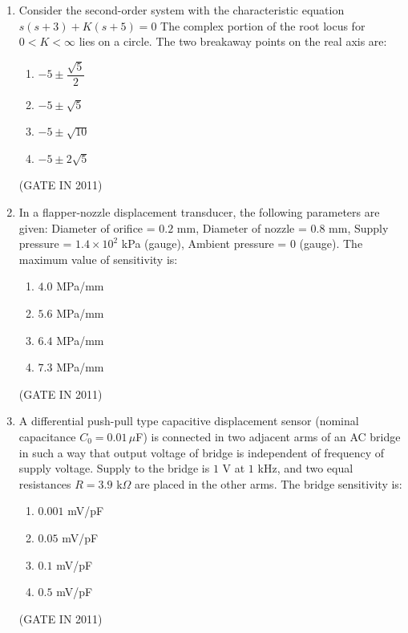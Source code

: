 \documentclass[journal]{IEEEtran}
\begin{document}
\begin{enumerate}
\item Consider the second-order system with the characteristic equation  
$s(s + 3) + K(s + 5) = 0$  
The complex portion of the root locus for $0 < K < \infty$ lies on a circle. The two breakaway points on the real axis are:
\begin{multicols}{4}
\begin{enumerate}
\item $-5 \pm \dfrac{\sqrt{5}}{2}$  
\item $-5 \pm \sqrt{5}$  
\item $-5 \pm \sqrt{10}$  
\item $-5 \pm {2}\sqrt{5}$
\end{enumerate}
\end{multicols} \hfill(GATE IN 2011)

\item In a flapper-nozzle displacement transducer, the following parameters are given:  
Diameter of orifice = $0.2$ mm, Diameter of nozzle = $0.8$ mm, Supply pressure = $1.4 \times 10^2$ kPa (gauge), Ambient pressure = $0$ (gauge).  
The maximum value of sensitivity is:
\begin{multicols}{4}
\begin{enumerate}
\item $4.0$ MPa/mm  
\item $5.6$ MPa/mm  
\item $6.4$ MPa/mm  
\item $7.3$ MPa/mm
\end{enumerate}
\end{multicols} \hfill(GATE IN 2011)

\item A differential push-pull type capacitive displacement sensor (nominal capacitance $C_0 = 0.01\,\mu$F) is connected in two adjacent arms of an AC bridge in such a way that output voltage of bridge is independent of frequency of supply voltage. Supply to the bridge is $1$ V at $1$ kHz, and two equal resistances $R = 3.9$ k$\Omega$ are placed in the other arms. The bridge sensitivity is:
\begin{multicols}{4}
\begin{enumerate}
\item $0.001$ mV/pF  
\item $0.05$ mV/pF  
\item $0.1$ mV/pF  
\item $0.5$ mV/pF
\end{enumerate}
\end{multicols} \hfill(GATE IN 2011)


\end{enumerate}
\end{document}
